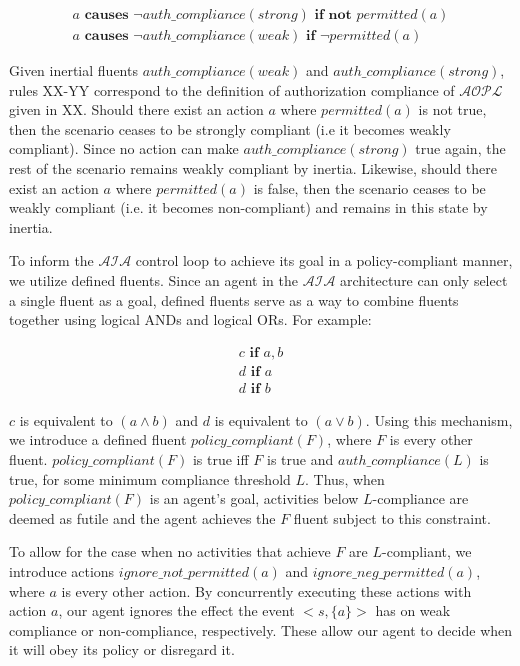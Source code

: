 \begin{gather}
    a \textbf{ causes } \neg auth\_compliance(strong) \textbf{ if not } permitted(a) \\
    a \textbf{ causes } \neg auth\_compliance(weak) \textbf{ if } \neg permitted(a)
\end{gather}

Given inertial fluents $auth\_compliance(weak)$ and $auth\_compliance(strong)$, rules XX-YY correspond to the definition of authorization compliance of $\mathcal{AOPL}$ given in XX.
Should there exist an action $a$ where $permitted(a)$ is not true, then the scenario ceases to be strongly compliant (i.e it becomes weakly compliant).
Since no action can make $auth\_compliance(strong)$ true again, the rest of the scenario remains weakly compliant by inertia.
Likewise, should there exist an action $a$ where $permitted(a)$ is false, then the scenario ceases to be weakly compliant (i.e. it becomes non-compliant) and remains in this state by inertia.

To inform the $\mathcal{AIA}$ control loop to achieve its goal in a policy-compliant manner, we utilize defined fluents.
Since an agent in the $\mathcal{AIA}$ architecture can only select a single fluent as a goal, defined fluents serve as a way to combine fluents together using logical ANDs and logical ORs.
For example:

\begin{gather}
    c \textbf{ if } a, b \\
    d \textbf{ if } a \\
    d \textbf{ if } b
\end{gather}

$c$ is equivalent to $(a \land b)$ and $d$ is equivalent to $(a \lor b)$.
Using this mechanism, we introduce a defined fluent $policy\_compliant(F)$, where $F$ is every other fluent.
$policy\_compliant(F)$ is true iff $F$ is true and $auth\_compliance(L)$ is true, for some minimum compliance threshold $L$.
Thus, when $policy\_compliant(F)$ is an agent's goal, activities below $L$-compliance are deemed as futile and the agent achieves the $F$ fluent subject to this constraint.

To allow for the case when no activities that achieve $F$ are $L$-compliant, we introduce actions $ignore\_not\_permitted(a)$ and $ignore\_neg\_permitted(a)$, where $a$ is every other action.
By concurrently executing these actions with action $a$, our agent ignores the effect the event $<s, \{a\}>$ has on weak compliance or non-compliance, respectively.
These allow our agent to decide when it will obey its policy or disregard it.


